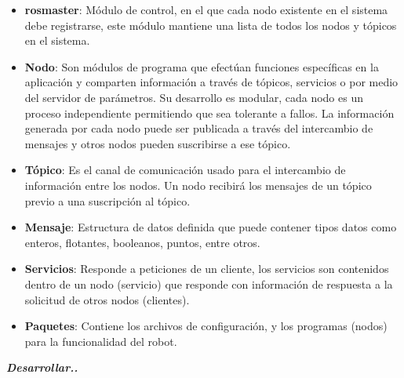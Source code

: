 \begin{itemize}\setlength{\itemsep}{-1mm}
\item \textbf{rosmaster}: Módulo de control, en el que cada nodo existente en el sistema debe registrarse, este módulo mantiene una lista de todos los nodos y tópicos en el sistema.
\item \textbf{Nodo}: Son módulos de programa que efectúan funciones específicas en la aplicación y comparten información a través de tópicos, servicios o por medio del servidor de parámetros. Su desarrollo es modular, cada nodo es un proceso independiente permitiendo que sea tolerante a fallos. La información generada por cada nodo puede ser publicada a través del intercambio de mensajes y otros nodos pueden suscribirse a ese tópico.
\item \textbf{Tópico}: Es el canal de comunicación usado para el intercambio de información entre los nodos. Un nodo recibirá los mensajes de un tópico previo a una suscripción al tópico.
\item \textbf{Mensaje}: Estructura de datos definida que puede contener tipos datos como enteros, flotantes, booleanos, puntos, entre otros.
\item \textbf{Servicios}: Responde a peticiones de un cliente, los servicios son contenidos dentro de un nodo (servicio) que responde con información de respuesta a la solicitud de otros nodos (clientes). 
\item \textbf{Paquetes}: Contiene los archivos de configuración, y los programas (nodos) para la funcionalidad del robot.
  
\end{itemize}

\textit{\textbf{Desarrollar..}}

